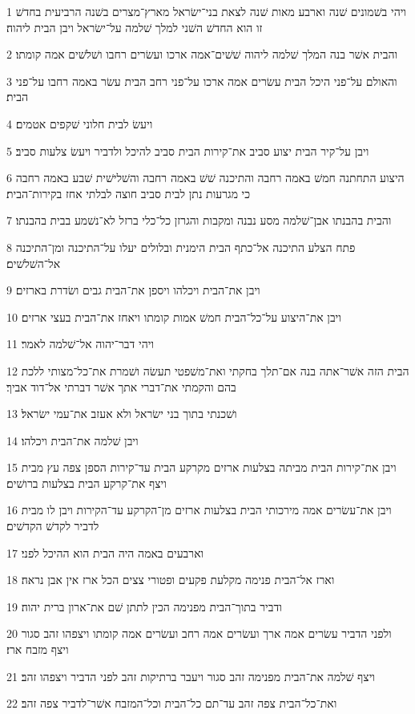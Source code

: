 \par 1 ויהי בשׁמונים שׁנה וארבע מאות שׁנה לצאת בני־ישׂראל מארץ־מצרים בשׁנה הרביעית בחדשׁ זו הוא החדשׁ השׁני למלך שׁלמה על־ישׂראל ויבן הבית ליהוה׃
\par 2 והבית אשׁר בנה המלך שׁלמה ליהוה שׁשׁים־אמה ארכו ועשׂרים רחבו ושׁלשׁים אמה קומתו׃
\par 3 והאולם על־פני היכל הבית עשׂרים אמה ארכו על־פני רחב הבית עשׂר באמה רחבו על־פני הבית׃
\par 4 ויעשׂ לבית חלוני שׁקפים אטמים׃
\par 5 ויבן על־קיר הבית יצוע סביב את־קירות הבית סביב להיכל ולדביר ויעשׂ צלעות סביב׃
\par 6 היצוע התחתנה חמשׁ באמה רחבה והתיכנה שׁשׁ באמה רחבה והשׁלישׁית שׁבע באמה רחבה כי מגרעות נתן לבית סביב חוצה לבלתי אחז בקירות־הבית׃
\par 7 והבית בהבנתו אבן־שׁלמה מסע נבנה ומקבות והגרזן כל־כלי ברזל לא־נשׁמע בבית בהבנתו׃
\par 8 פתח הצלע התיכנה אל־כתף הבית הימנית ובלולים יעלו על־התיכנה ומן־התיכנה אל־השׁלשׁים׃
\par 9 ויבן את־הבית ויכלהו ויספן את־הבית גבים ושׂדרת בארזים׃
\par 10 ויבן את־היצוע על־כל־הבית חמשׁ אמות קומתו ויאחז את־הבית בעצי ארזים׃
\par 11 ויהי דבר־יהוה אל־שׁלמה לאמר׃
\par 12 הבית הזה אשׁר־אתה בנה אם־תלך בחקתי ואת־משׁפטי תעשׂה ושׁמרת את־כל־מצותי ללכת בהם והקמתי את־דברי אתך אשׁר דברתי אל־דוד אביך׃
\par 13 ושׁכנתי בתוך בני ישׂראל ולא אעזב את־עמי ישׂראל׃
\par 14 ויבן שׁלמה את־הבית ויכלהו׃
\par 15 ויבן את־קירות הבית מביתה בצלעות ארזים מקרקע הבית עד־קירות הספן צפה עץ מבית ויצף את־קרקע הבית בצלעות ברושׁים׃
\par 16 ויבן את־עשׂרים אמה מירכותי הבית בצלעות ארזים מן־הקרקע עד־הקירות ויבן לו מבית לדביר לקדשׁ הקדשׁים׃
\par 17 וארבעים באמה היה הבית הוא ההיכל לפני׃
\par 18 וארז אל־הבית פנימה מקלעת פקעים ופטורי צצים הכל ארז אין אבן נראה׃
\par 19 ודביר בתוך־הבית מפנימה הכין לתתן שׁם את־ארון ברית יהוה׃
\par 20 ולפני הדביר עשׂרים אמה ארך ועשׂרים אמה רחב ועשׂרים אמה קומתו ויצפהו זהב סגור ויצף מזבח ארז׃
\par 21 ויצף שׁלמה את־הבית מפנימה זהב סגור ויעבר ברתיקות זהב לפני הדביר ויצפהו זהב׃
\par 22 ואת־כל־הבית צפה זהב עד־תם כל־הבית וכל־המזבח אשׁר־לדביר צפה זהב׃
